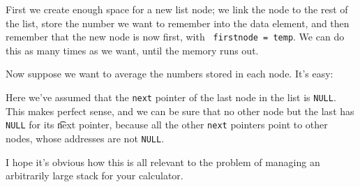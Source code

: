 \begin{flushleft}
\verb% struct listnode *temp;% \\* 
\verb% % \\* 
\verb% temp = malloc(sizeof(struct listnode));% \\* 
\verb% % \\* 
\verb% (*temp).next = firstnode;% \\* 
\verb% (*temp).data = newnumber;% \\* 
\verb% firstnode = temp;% \\* 
\end{flushleft}

First we create enough space for a new list node; we link the node to
the rest of the list, store the number we want to remember into the data
element, and then remember that the new node is now first, with {\tt
firstnode = temp}.  We can do this as many times as we want, until the
memory runs out.  

Now suppose we want to average the numbers stored in each node.  It's
easy:

\begin{flushleft}
\verb% struct listnode *current;%  \\*
\verb% int average;%  \\*
\verb% long int sum = 0L;%  \\*
\verb% int nodecount = 0;%  \\*
\verb% %  \\*
\verb% for (listnode = firstnode; % \*
\verb%      listnode != NULL; %  \\*
\verb%      listnode = (*listnode).next) {%  \\*
\verb%   sum += (*listnode).data; %  \\*
\verb%   nodecount += 1;%  \\*
\verb% }%  \\*
\verb% %  \\*
\verb% average = sum / nodecount;%  \\*
\end{flushleft}

Here we've assumed that the {\tt next} pointer of the last node in the
list is {\tt NULL}.  This makes perfect sense, and we can be sure that
no other node but the last has {\tt NULL} for its {\t next} pointer,
because all the other {\tt next} pointers point to other nodes, whose
addresses are not {\tt NULL}. 

I hope it's obvious how this is all relevant to the problem of managing
an arbitrarily large stack for your calculator.  

